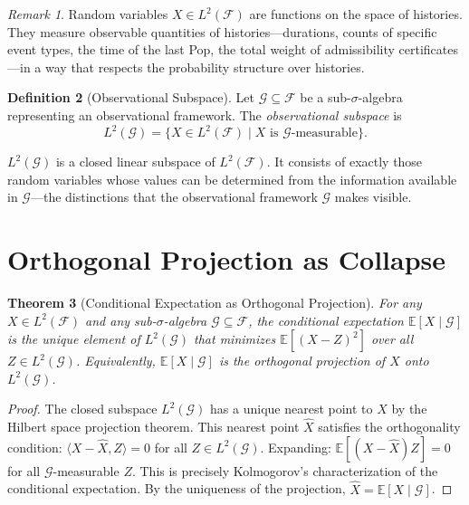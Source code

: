 \documentclass[12pt, a4paper, openany]{book}
\theoremstyle{plain}
\newtheorem{theorem}{Theorem}[chapter]
\theoremstyle{definition}
\newtheorem{definition}[theorem]{Definition}
\theoremstyle{remark}
\newtheorem{remark}[theorem]{Remark}
\begin{document}
\begin{remark}
Random variables $X \in L^2(\mathcal{F})$ are functions on the space of histories.
They measure observable quantities of histories---durations, counts of specific
event types, the time of the last Pop, the total weight of admissibility
certificates---in a way that respects the probability structure over histories.
\end{remark}

\begin{definition}[Observational Subspace]
Let $\mathcal{G} \subseteq \mathcal{F}$ be a sub-$\sigma$-algebra representing
an observational framework. The \emph{observational subspace} is
\[
L^2(\mathcal{G}) = \{X \in L^2(\mathcal{F}) \mid X \text{ is } \mathcal{G}\text{-measurable}\}.
\]
\end{definition}

$L^2(\mathcal{G})$ is a closed linear subspace of $L^2(\mathcal{F})$. It consists
of exactly those random variables whose values can be determined from the
information available in $\mathcal{G}$---the distinctions that the observational
framework $\mathcal{G}$ makes visible.

\section{Orthogonal Projection as Collapse}

\begin{theorem}[Conditional Expectation as Orthogonal Projection]
For any $X \in L^2(\mathcal{F})$ and any sub-$\sigma$-algebra
$\mathcal{G} \subseteq \mathcal{F}$, the conditional expectation
$\mathbb{E}[X \mid \mathcal{G}]$ is the unique element of $L^2(\mathcal{G})$
that minimizes $\mathbb{E}[(X - Z)^2]$ over all $Z \in L^2(\mathcal{G})$.
Equivalently, $\mathbb{E}[X \mid \mathcal{G}]$ is the orthogonal projection of
$X$ onto $L^2(\mathcal{G})$.
\end{theorem}

\begin{proof}
The closed subspace $L^2(\mathcal{G})$ has a unique nearest point to $X$
by the Hilbert space projection theorem. This nearest point $\hat{X}$ satisfies
the orthogonality condition: $\langle X - \hat{X}, Z \rangle = 0$ for all
$Z \in L^2(\mathcal{G})$. Expanding: $\mathbb{E}[(X - \hat{X})Z] = 0$ for all
$\mathcal{G}$-measurable $Z$. This is precisely Kolmogorov's characterization of
the conditional expectation. By the uniqueness of the projection, $\hat{X} =
\mathbb{E}[X \mid \mathcal{G}]$.
\end{proof}
\end{document}
